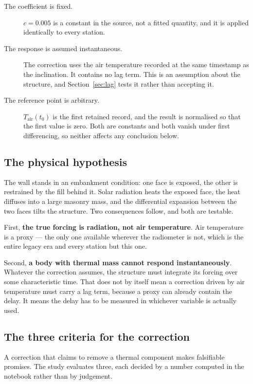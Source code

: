 \documentclass[11pt,a4paper]{article}
\begin{document}
\begin{description}
\item[The coefficient is fixed.] $c = 0.005$ is a constant in the source, not a fitted
quantity, and it is applied identically to every station.
\item[The response is assumed instantaneous.] The correction uses the air temperature
recorded at the same timestamp as the inclination. It contains no lag term. This is an
assumption about the structure, and Section~\ref{sec:lag} tests it rather than
accepting it.
\item[The reference point is arbitrary.] $T_{\text{air}}(t_0)$ is the first retained
record, and the result is normalised so that the first value is zero. Both are
constants and both vanish under first differencing, so neither affects any conclusion
below.
\end{description}

\subsection{The physical hypothesis}
\label{sec:hypothesis}

The wall stands in an embankment condition: one face is exposed, the other is
restrained by the fill behind it. Solar radiation heats the exposed face, the heat
diffuses into a large masonry mass, and the differential expansion between the two
faces tilts the structure. Two consequences follow, and both are testable.

First, \textbf{the true forcing is radiation, not air temperature}. Air temperature is
a proxy --- the only one available wherever the radiometer is not, which is the entire
legacy era and every station but this one.

Second, \textbf{a body with thermal mass cannot respond instantaneously}. Whatever the
correction assumes, the structure must integrate its forcing over some characteristic
time. That does not by itself mean a correction driven by air temperature must carry a
lag term, because a proxy can already contain the delay. It means the delay has to be
measured in whichever variable is actually used.

\subsection{The three criteria for the correction}

A correction that claims to remove a thermal component makes falsifiable promises. The
study evaluates three, each decided by a number computed in the notebook rather than by
judgement.
\end{document}
